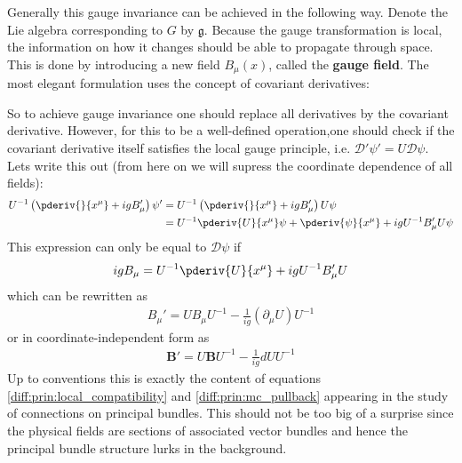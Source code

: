 	Generally this gauge invariance can be achieved in the following way. Denote the Lie algebra corresponding to $G$ by $\mathfrak{g}$. Because the gauge transformation is local, the information on how it changes should be able to propagate through space. This is done by introducing a new field $B_\mu(x)$, called the \textbf{gauge field}. The most elegant formulation uses the concept of covariant derivatives:
	
	So to achieve gauge invariance one should replace all derivatives by the covariant derivative. However, for this to be a well-defined operation,one should check if the covariant derivative itself satisfies the local gauge principle, i.e. $\mathcal{D}'\psi' = U\mathcal{D}\psi$. Lets write this out (from here on we will supress the coordinate dependence of all fields):
	\begin{align}
		U^{-1}\left(\pderiv{}{x^\mu} + igB_\mu'\right)\psi' &= U^{-1}\left(\pderiv{}{x^\mu} + igB_\mu'\right)U\psi\nonumber\\
		&= U^{-1}\pderiv{U}{x^\mu}\psi + \pderiv{\psi}{x^\mu} + igU^{-1}B_\mu'U\psi
	\end{align}
	This expression can only be equal to $\mathcal{D}\psi$ if
	\begin{gather}
		igB_\mu = U^{-1}\pderiv{U}{x^\mu} + igU^{-1}B_\mu'U
	\end{gather}
	which can be rewritten as
	\begin{gather}
		B_\mu' = UB_\mu U^{-1} - \frac{1}{ig}(\partial_\mu U)U^{-1}
	\end{gather}
	or in coordinate-independent form as
	\begin{gather}
		\boxed{\mathbf{B}' = U\mathbf{B}U^{-1} - \frac{1}{ig}dUU^{-1}}
	\end{gather}
	Up to conventions this is exactly the content of equations \ref{diff:prin:local_compatibility} and \ref{diff:prin:mc_pullback} appearing in the study of connections on principal bundles. This should not be too big of a surprise since the physical fields are sections of associated vector bundles and hence the principal bundle structure lurks in the background.
	
